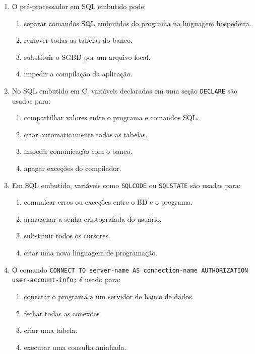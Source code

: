 \documentclass[12pt,a4paper]{article}
\begin{document}
\begin{enumerate}[label=\textbf{Q\arabic*.}]
\item O pré-processador em SQL embutido pode:

\begin{enumerate}[label=\alph*)]
    \item separar comandos SQL embutidos do programa na linguagem hospedeira.
    \item remover todas as tabelas do banco.
    \item substituir o SGBD por um arquivo local.
    \item impedir a compilação da aplicação.
\end{enumerate}

\item No SQL embutido em C, variáveis declaradas em uma seção \texttt{DECLARE} são usadas para:

\begin{enumerate}[label=\alph*)]
    \item compartilhar valores entre o programa e comandos SQL.
    \item criar automaticamente todas as tabelas.
    \item impedir comunicação com o banco.
    \item apagar exceções do compilador.
\end{enumerate}

\item Em SQL embutido, variáveis como \texttt{SQLCODE} ou \texttt{SQLSTATE} são usadas para:

\begin{enumerate}[label=\alph*)]
    \item comunicar erros ou exceções entre o BD e o programa.
    \item armazenar a senha criptografada do usuário.
    \item substituir todos os cursores.
    \item criar uma nova linguagem de programação.
\end{enumerate}

\item O comando \texttt{CONNECT TO server-name AS connection-name AUTHORIZATION user-account-info;} é usado para:

\begin{enumerate}[label=\alph*)]
    \item conectar o programa a um servidor de banco de dados.
    \item fechar todas as conexões.
    \item criar uma tabela.
    \item executar uma consulta aninhada.
\end{enumerate}


\end{enumerate}
\end{document}
